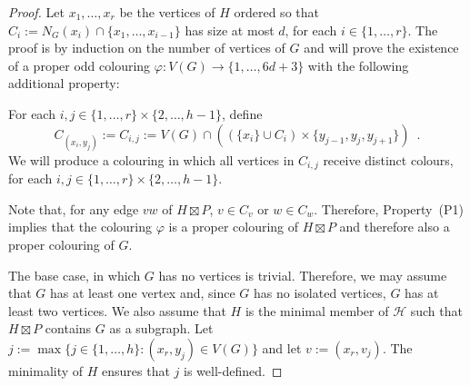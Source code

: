 \documentclass{patmorin}
\begin{document}
\begin{proof}
  Let $x_1,\ldots,x_r$ be the vertices of $H$ ordered so that  $C_i:=N_G(x_i)\cap\{x_1,\ldots,x_{i-1}\}$ has size at most $d$, for each $i\in\{1,\ldots,r\}$.  The proof is by induction on the number of vertices of $G$ and will prove the existence of a proper odd colouring $\varphi:V(G)\to\{1,\ldots,6d+3\}$ with the following additional property:
  \begin{compactenum}[(P1)]
    \item For each $i,j\in\{1,\ldots,r\}\times \{2,\ldots,h-1\}$, define
    \[
      C_{(x_i,y_j)}:=C_{i,j}:=V(G)\cap ((\{x_i\}\cup C_i)\times\{y_{j-1}, y_{j},y_{j+1}\})
      \enspace .
    \]
    We will produce a colouring in which all vertices in $C_{i,j}$ receive distinct colours, for each $i,j\in\{1,\ldots,r\}\times\{2,\ldots,h-1\}$.
  \end{compactenum}
  Note that, for any edge $vw$ of $H\boxtimes P$, $v \in C_v$ or $w\in C_w$.  Therefore, Property~(P1) implies that the colouring $\varphi$ is a proper colouring of $H\boxtimes P$ and therefore also a proper colouring of $G$.

  The base case, in which $G$ has no vertices is trivial. Therefore, we may assume that $G$ has at least one vertex and, since $G$ has no isolated vertices, $G$ has at least two vertices.  We also assume that $H$ is the minimal member of $\mathcal{H}$ such that $H\boxtimes P$ contains $G$ as a subgraph.  Let $j:=\max\{j\in\{1,\ldots,h\}:(x_r,y_j)\in V(G)\}$ and let $v:=(x_r,v_j)$.  The minimality of $H$ ensures that $j$ is well-defined.





\end{proof}
\end{document}
